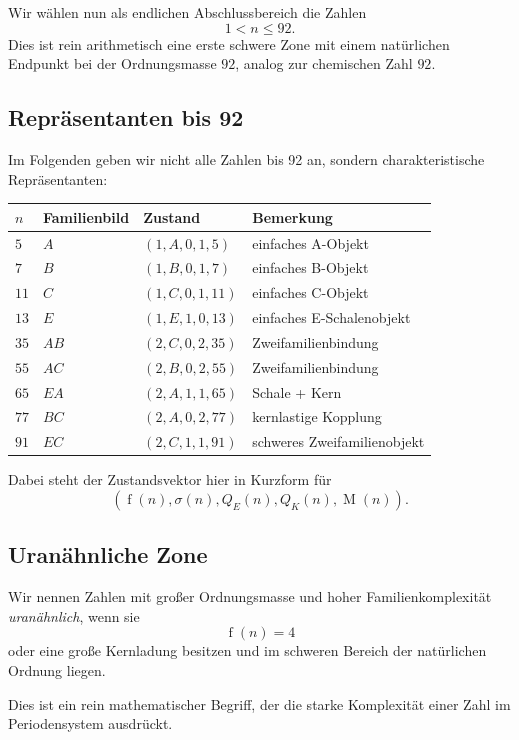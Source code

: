 \documentclass[12pt,a4paper]{article}
\newcommand{\sign}{\sigma}
\newcommand{\Mass}{\operatorname{M}}
\newcommand{\QE}{Q_E}
\newcommand{\QK}{Q_K}
\newcommand{\rank}{\operatorname{f}}
\begin{document}
	Wir wählen nun als endlichen Abschlussbereich die Zahlen
	\[
	1<n\le 92.
	\]
	Dies ist rein arithmetisch eine erste schwere Zone mit einem natürlichen Endpunkt bei der Ordnungsmasse $92$, analog zur chemischen Zahl $92$.
	
	\subsection*{Repräsentanten bis 92}
	Im Folgenden geben wir nicht alle Zahlen bis 92 an, sondern charakteristische Repräsentanten:
	
	\begin{longtable}{>{\raggedright\arraybackslash}p{1.5cm} >{\raggedright\arraybackslash}p{3.2cm} >{\raggedright\arraybackslash}p{4.4cm} >{\raggedright\arraybackslash}p{4.7cm}}
		\toprule
		\textbf{$n$} & \textbf{Familienbild} & \textbf{Zustand} & \textbf{Bemerkung}\\
		\midrule
		\endhead
		
		$5$ & $A$ & $(1,A,0,1,5)$ & einfaches A-Objekt\\
		$7$ & $B$ & $(1,B,0,1,7)$ & einfaches B-Objekt\\
		$11$ & $C$ & $(1,C,0,1,11)$ & einfaches C-Objekt\\
		$13$ & $E$ & $(1,E,1,0,13)$ & einfaches E-Schalenobjekt\\
		$35$ & $AB$ & $(2,C,0,2,35)$ & Zweifamilienbindung\\
		$55$ & $AC$ & $(2,B,0,2,55)$ & Zweifamilienbindung\\
		$65$ & $EA$ & $(2,A,1,1,65)$ & Schale + Kern\\
		$77$ & $BC$ & $(2,A,0,2,77)$ & kernlastige Kopplung\\
		$91$ & $EC$ & $(2,C,1,1,91)$ & schweres Zweifamilienobjekt\\
		\bottomrule
	\end{longtable}
	
	Dabei steht der Zustandsvektor hier in Kurzform für
	\[
	(\rank(n),\sign(n),\QE(n),\QK(n),\Mass(n)).
	\]
	
	\subsection*{Uranähnliche Zone}
	Wir nennen Zahlen mit großer Ordnungsmasse und hoher Familienkomplexität \emph{uranähnlich}, wenn sie
	\[
	\rank(n)=4
	\]
	oder eine große Kernladung besitzen und im schweren Bereich der natürlichen Ordnung liegen.
	
	Dies ist ein rein mathematischer Begriff, der die starke Komplexität einer Zahl im Periodensystem ausdrückt.
	
\end{document}
